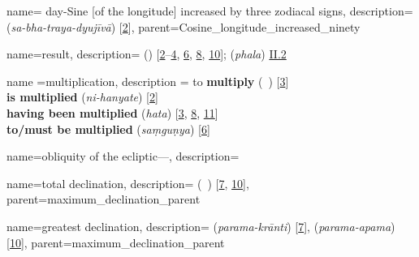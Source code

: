 {
        name= {day-Sine [of the longitude] increased by three zodiacal signs},
        description={ (\textit{sa-bha-traya-dyujīvā}) [\hyperlink{SEpass2}{2}]},
        parent={Cosine_longitude_increased_ninety}   
}


{
        name={result},
        description={ (\hasil) [\hyperlink{PEpass2}{2}--\hyperlink{PEpass4}{4}, \hyperlink{PEpass6}{6}, \hyperlink{PEpass8}{8}, \hyperlink{PEpass10}{10}];  (\textit{phala}) \hyperlink{Sii2}{II.2}}
}

{
        name ={multiplication},
        description ={\newline
           to \textbf{multiply}\quad {} (\darb\ \kardan) [\hyperlink{PEpass3}{3}]\\[0.2\baselineskip]
        \textbf{is multiplied}\quad {} (\textit{ni-hanyate}) [\hyperlink{SEpass2}{2}]\\[0.2\baselineskip]
         \textbf{having been multiplied}\quad {} (\textit{hata}) [\hyperlink{SEpass3}{3}, \hyperlink{SEpass8}{8}, \hyperlink{SEpass11}{11}]\\[0.2\baselineskip]
         \textbf{to/must be multiplied}\quad {} (\textit{saṃguṇya}) [\hyperlink{SEpass6}{6}]}
}

{
        name={obliquity of the ecliptic---},
        description={\phantom{x}\nopagebreak}
}

{       
        name={total declination},
        description={ (\mayl\idafaconsonant\ \kulli) [\hyperlink{PEpass7}{7}, \hyperlink{PEpass10}{10}]},
        parent={maximum_declination_parent}
}

{
        name={greatest declination},
        description={ (\textit{parama-krānti}) [\hyperlink{SEpass7}{7}],  (\textit{parama-apama}) [\hyperlink{SEpass10}{10}]},
        parent={maximum_declination_parent}
}        
        
